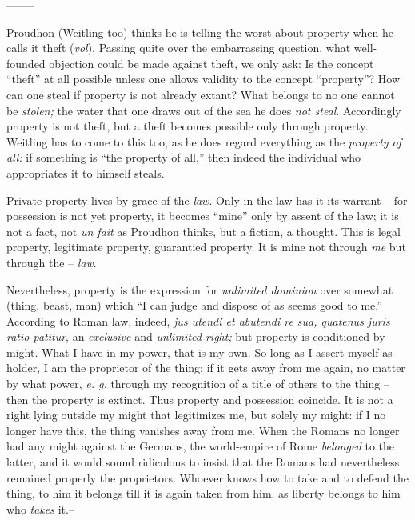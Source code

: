 \documentclass[12pt,a4paper]{book}
\begin{document}
\begin{center}
--------\end{center}


Proudhon (Weitling too) thinks he is telling the worst about property when he 
calls it theft (\textit{vol}). Passing quite over the embarrassing question, 
what well-founded objection could be made against theft, we only ask: Is the 
concept ``theft'' at all possible unless one allows validity to the concept 
``property''? How can one steal if property is not already extant? What 
belongs to no one cannot be \textit{stolen;} the water that one draws out of 
the sea he does \textit{not steal}. Accordingly property is not theft, but a 
theft becomes possible only through property. Weitling has to come to this 
too, as he does regard everything as the \textit{property of all:} if 
something is ``the property of all,'' then indeed the individual who 
appropriates it to himself steals.

Private property lives by grace of the \textit{law}. Only in the law has it 
its warrant -- for possession is not yet property, it becomes ``mine'' only 
by assent of the law; it is not a fact, not \textit{un fait} as Proudhon 
thinks, but a fiction, a thought. This is legal property, legitimate property, 
guarantied property. It is mine not through \textit{me} but through the -- 
\textit{law}.

Nevertheless, property is the expression for \textit{unlimited dominion} over 
somewhat (thing, beast, man) which ``I can judge and dispose of as seems good 
to me.'' According to Roman law, indeed, \textit{jus utendi et abutendi re 
sua, quatenus juris ratio patitur}, an \textit{exclusive} and 
\textit{unlimited right;} but property is conditioned by might. What I have in 
my power, that is my own. So long as I assert myself as holder, I am the 
proprietor of the thing; if it gets away from me again, no matter by what 
power, \textit{e. g.} through my recognition of a title of others to the thing 
-- then the property is extinct. Thus property and possession coincide. It is 
not a right lying outside my might that legitimizes me, but solely my might: 
if I no longer have this, the thing vanishes away from me. When the Romans no 
longer had any might against the Germans, the world-empire of Rome 
\textit{belonged} to the latter, and it would sound ridiculous to insist that 
the Romans had nevertheless remained properly the proprietors. Whoever knows 
how to take and to defend the thing, to him it belongs till it is again taken 
from him, as liberty belongs to him who \textit{takes} it.--
\end{document}
